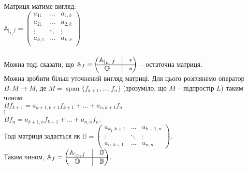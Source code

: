 \documentclass[a4paper, 10pt]{article}
\theoremstyle{theoremdd}
\DeclareMathOperator{\linspan}{span}
\begin{document}
Матриця матиме вигляд:\\
$\mathbb{A}_{|_{L_1}f} = \begin{pmatrix}
a_{11} & \dots & a_{1,k}\\
a_{21} & \dots & a_{2,k}\\
\vdots & \ddots & \vdots\\
a_{k,1} & \dots & a_{k,k}\\
\end{pmatrix}$\\
\\
Можна тоді сказати, що 
$\mathbb{A}_f = \begin{pmatrix}
 \mathbb{A}_{|_{L_1}f}  & \vline & * \\
 \hline
 \mathbb{O} & \vline & *
\end{pmatrix}$ -- остаточна матриця.
\bigskip \\
Можна зробити більш уточнений вигляд матриці. Для цього розглянемо оператор $B \colon M \to M$, де $M = \linspan\{f_{k+1},\dots,f_n\}$ (зрозуміло, що $M$ -- підпростір $L$) таким чином:\\
$Bf_{k+1} = a_{k+1,k+1}f_{k+1} + \dots + a_{n,k+1}f_n$\\
$\vdots$\\
$Bf_{n} = a_{k+1,n}f_{k+1} + \dots + a_{n,n}f_n$.\\
Тоді матриця задається як $\mathbb{B} = \begin{pmatrix}
a_{k_1,k+1} & \dots & a_{k+1,n} \\
\vdots & \ddots & \vdots \\
a_{n,k+1} & \dots & a_{n,n}
\end{pmatrix}$.\\
Таким чином, $\mathbb{A}_f = \begin{pmatrix}
 \mathbb{A}_{|_{L_1}f}  & \vline & \mathbb{D} \\
 \hline
 \mathbb{O} & \vline & \mathbb{B}
\end{pmatrix}$.
\end{document}
